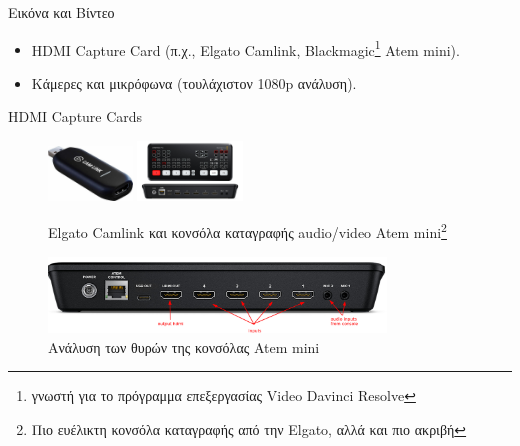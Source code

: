 \documentclass{beamer}
\begin{document}
\begin{frame}[allowframebreaks]{Εικόνα και Βίντεο}
  
  \begin{itemize}
  \item HDMI Capture Card (π.χ., Elgato Camlink, Blackmagic\footnote{γνωστή για το πρόγραμμα επεξεργασίας Video Davinci Resolve} Atem mini).
  \item Κάμερες και μικρόφωνα (τουλάχιστον 1080p ανάλυση).
  \end{itemize}
  \begin{block}{HDMI Capture Cards}
      \begin{figure}
    \centering
    \includegraphics[width=0.2\textwidth]{images/elgato.jpeg}
    \includegraphics[width=0.25\textwidth]{images/atem.jpg}
    \caption{Elgato Camlink και κονσόλα καταγραφής audio/video Atem mini\footnote{Πιο ευέλικτη κονσόλα καταγραφής από την Elgato, αλλά και πιο ακριβή}}
    \end{figure}
  \end{block}
    \begin{figure}
    \centering
    \includegraphics[width=0.8\textwidth]{images/atem_explanation.png}
    \caption{Ανάλυση των θυρών της κονσόλας Atem mini}
    \end{figure}
\end{frame}
\end{document}
